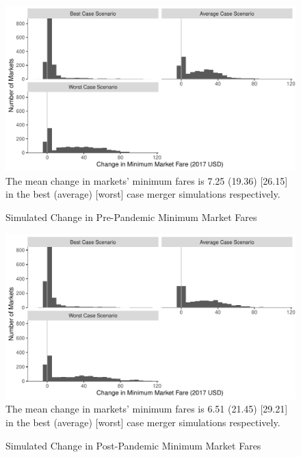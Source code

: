 \documentclass{article}
\begin{document}
      \begin{figure}
    \caption{Simulated Change in Pre-Pandemic Minimum Market Fares}
    \includegraphics[width = \linewidth]{PrePandemic_Merger_Change_MinimumFare_Dist}
    \label{fig:PrePan_MinimumFare_Dist}
    \footnotesize{The mean change in markets' minimum fares is 7.25 (19.36) [26.15] in the best (average) [worst] case merger simulations respectively.}  
    \end{figure}    

    \begin{figure}
    \caption{Simulated Change in Post-Pandemic Minimum Market Fares}
    \includegraphics[width = \linewidth]{Merger_Change_MinimumFare_Dist}
    \label{fig:PostPan_MinimumFare_Dist}
    \footnotesize{The mean change in markets' minimum fares is 6.51 (21.45) [29.21] in the best (average) [worst] case merger simulations respectively.}  
    \end{figure}    
\end{document}

